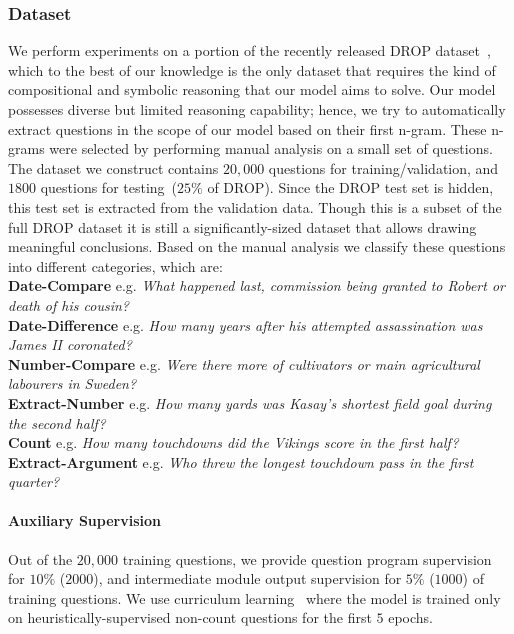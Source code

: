 \documentclass[main.tex]{subfiles}
\begin{document}
\subsubsection{Dataset}
\label{sssec:dataset}
We perform experiments on a portion of the recently released DROP dataset~\cite{drop-2019}, which to the best of our knowledge is the only dataset that requires the kind of compositional and symbolic reasoning that our model aims to solve. Our model possesses diverse but limited reasoning capability; hence, we try to automatically extract questions in the scope of our model based on their first n-gram.
These n-grams were selected by performing manual analysis on a small set of questions.
The dataset we construct contains $20,000$ questions for training/validation, and $1800$ questions for testing~($25\%$ of DROP). Since the DROP test set is hidden, this test set is extracted from the validation data.
Though this is a subset of the full DROP dataset it is still a significantly-sized dataset that allows drawing meaningful conclusions.
Based on the manual analysis we classify these questions into different categories, which are:
\\
\textbf{Date-Compare} e.g. \textit{What happened last, commission being granted to Robert or death of his cousin?}\\
\textbf{Date-Difference} e.g. \textit{How many years after his attempted assassination was James II coronated?}\\
\textbf{Number-Compare} e.g. \textit{Were there more of cultivators or main agricultural labourers in Sweden?}\\
\textbf{Extract-Number} e.g. \textit{How many yards was Kasay's shortest field goal during the second half?}\\
\textbf{Count} e.g. \textit{How many touchdowns did the Vikings score in the first half?}\\
\textbf{Extract-Argument} e.g. \textit{Who threw the longest touchdown pass in the first quarter?}


\paragraph{Auxiliary Supervision}
Out of the $20,000$ training questions, we provide question program supervision for $10\%$ ($2000$), and intermediate module output supervision for $5\%$ ($1000$) of training questions. We use curriculum learning~\cite{bengio-curriculum-2009} where the model is trained only on heuristically-supervised non-count questions for the first $5$ epochs.
\end{document}
